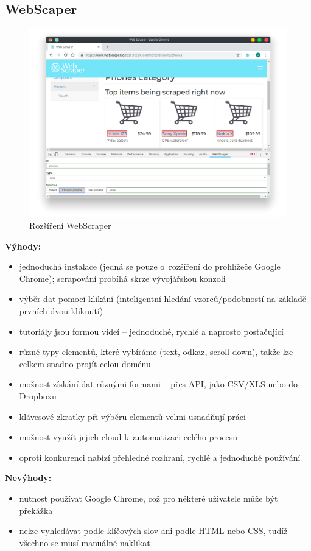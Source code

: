 \documentclass[thesis=B,czech]{FITthesis}[2012/06/26]
\begin{document}
\newpage
\subsection{WebScaper}
\begin{figure}[h]
	\includegraphics[width=\linewidth]{images/WebScraper.png}
	\caption{Rozšíření WebScraper\cite[snímek pořídil autor]{webscraper}}
	\label{fig:webScraper}
\end{figure}
\textbf{Výhody:}
\begin{itemize}
	\item jednoduchá instalace (jedná se pouze o~rozšíření do prohlížeče Google Chrome); scrapování probíhá skrze vývojářskou konzoli
	\item výběr dat pomocí klikání (inteligentní hledání vzorců/podobností na základě prvních dvou kliknutí)
	\item tutoriály jsou formou videí -- jednoduché, rychlé a naprosto postačující
	\item různé typy elementů, které vybíráme (text, odkaz, scroll down), takže lze celkem snadno projít celou doménu
	\item možnost získání dat různými formami -- přes API, jako CSV/XLS nebo do Dropboxu
	\item klávesové zkratky při výběru elementů velmi usnadňují práci
	\item možnost využít jejich cloud k~automatizaci celého procesu
	\item oproti konkurenci nabízí přehledné rozhraní, rychlé a jednoduché používání
\end{itemize}
\newpage
\textbf{Nevýhody:}
\begin{itemize}
	\item nutnost používat Google Chrome, což pro některé uživatele může být překážka
	\item nelze vyhledávat podle klíčových slov ani podle HTML nebo CSS, tudíž všechno se musí manuálně naklikat
\end{itemize}
\end{document}
